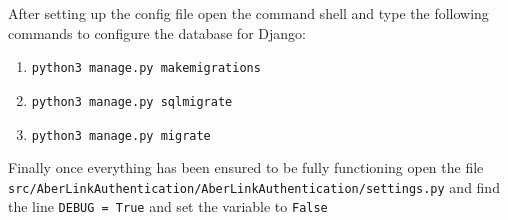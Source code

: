 After setting up the config file open the command shell and type the
following commands to configure the database for Django:

\begin{enumerate}
\def\labelenumi{\arabic{enumi}.}
\item
  \texttt{python3 manage.py makemigrations}
\item
  \texttt{python3 manage.py sqlmigrate}
\item
  \texttt{python3 manage.py migrate}
\end{enumerate}

Finally once everything has been ensured to be fully functioning open
the file \\\verb|src/AberLinkAuthentication/AberLinkAuthentication/settings.py| and find the line \texttt{DEBUG = True} and set the variable to
\texttt{False}
